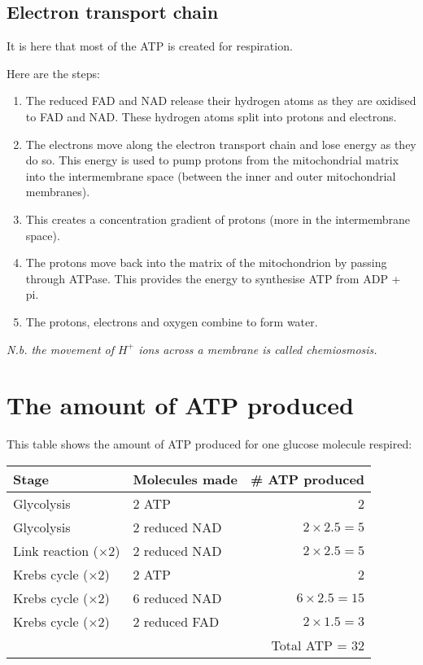 \documentclass{article}
\begin{document}
\subsection*{Electron transport chain}
It is here that most of the ATP is created for respiration.

Here are the steps:
\begin{enumerate}
	\item The reduced FAD and NAD release their hydrogen atoms as they are oxidised to FAD and NAD. These hydrogen atoms split into protons and electrons.
	\item The electrons move along the electron transport chain and lose energy as they do so. This energy is used to pump protons from the mitochondrial matrix into the intermembrane space (between the inner and outer mitochondrial membranes).
	\item This creates a concentration gradient of protons (more in the intermembrane space).
	\item The protons move back into the matrix of the mitochondrion by passing through ATPase. This provides the energy to synthesise ATP from ADP + pi.
	\item The protons, electrons and oxygen combine to form water.
\end{enumerate}

\textit{N.b. the movement of $H^+$ ions across a membrane is called chemiosmosis.}

\section*{The amount of ATP produced}
This table shows the amount of ATP produced for one glucose molecule respired:

\begin{center}
	\begin{tabular}{|l|l|r|}
		\hline
			Stage & Molecules made & \# ATP produced\\ \hline
			Glycolysis & 2 ATP & 2\\ \hline
			Glycolysis & 2 reduced NAD & $2 \times 2.5 = 5$\\ \hline
			Link reaction ($\times 2$) & 2 reduced NAD & $2 \times 2.5 = 5$\\ \hline
			Krebs cycle ($\times 2$) & 2 ATP & 2\\ \hline
			Krebs cycle ($\times 2$) & 6 reduced NAD & $6 \times 2.5 = 15$\\ \hline
			Krebs cycle ($\times 2$) & 2 reduced FAD & $2 \times 1.5 = 3$\\ \hline
			\multicolumn{3}{|r|}{Total ATP = 32}\\ \hline
	\end{tabular}
\end{center}
\end{document}
